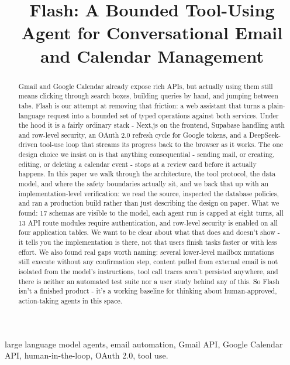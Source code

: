 \documentclass[conference]{IEEEtran}
\begin{document}
\title{Flash: A Bounded Tool-Using Agent for Conversational Email and Calendar Management}

\author{
}

\maketitle

\begin{abstract}
Gmail and Google Calendar already expose rich APIs, but actually using them still means clicking through search boxes, building queries by hand, and jumping between tabs. Flash is our attempt at removing that friction: a web assistant that turns a plain-language request into a bounded set of typed operations against both services. Under the hood it is a fairly ordinary stack - Next.js on the frontend, Supabase handling auth and row-level security, an OAuth 2.0 refresh cycle for Google tokens, and a DeepSeek-driven tool-use loop that streams its progress back to the browser as it works. The one design choice we insist on is that anything consequential - sending mail, or creating, editing, or deleting a calendar event - stops at a review card before it actually happens. In this paper we walk through the architecture, the tool protocol, the data model, and where the safety boundaries actually sit, and we back that up with an implementation-level verification: we read the source, inspected the database policies, and ran a production build rather than just describing the design on paper. What we found: 17 schemas are visible to the model, each agent run is capped at eight turns, all 13 API route modules require authentication, and row-level security is enabled on all four application tables. We want to be clear about what that does and doesn't show - it tells you the implementation is there, not that users finish tasks faster or with less effort. We also found real gaps worth naming: several lower-level mailbox mutations still execute without any confirmation step, content pulled from external email is not isolated from the model's instructions, tool call traces aren't persisted anywhere, and there is neither an automated test suite nor a user study behind any of this. So Flash isn't a finished product - it's a working baseline for thinking about human-approved, action-taking agents in this space.

\end{abstract}
\begin{IEEEkeywords}
large language model agents, email automation, Gmail API, Google Calendar API, human-in-the-loop, OAuth 2.0, tool use.
\end{IEEEkeywords}
\end{document}
